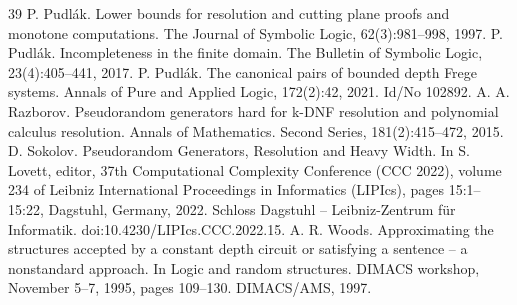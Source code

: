 \documentclass[10pt,a4paper]{article}
\begin{document}
\begin{thebibliography}{39}
 P. Pudlák. Lower bounds for resolution and cutting plane proofs and monotone computations. The Journal of Symbolic Logic, 62(3):981–998, 1997.
 P. Pudlák. Incompleteness in the finite domain. The Bulletin of Symbolic Logic, 23(4):405–441, 2017.
 P. Pudlák. The canonical pairs of bounded depth Frege systems. Annals of Pure and Applied Logic, 172(2):42, 2021. Id/No 102892.
 A. A. Razborov. Pseudorandom generators hard for k-DNF resolution and polynomial calculus resolution. Annals of Mathematics. Second Series, 181(2):415–472, 2015.
 D. Sokolov. Pseudorandom Generators, Resolution and Heavy Width. In S. Lovett, editor, 37th Computational Complexity Conference (CCC 2022), volume 234 of Leibniz International Proceedings in Informatics (LIPIcs), pages 15:1–15:22, Dagstuhl, Germany, 2022. Schloss Dagstuhl – Leibniz-Zentrum für Informatik. doi:10.4230/LIPIcs.CCC.2022.15.
 A. R. Woods. Approximating the structures accepted by a constant depth circuit or satisfying a sentence – a nonstandard approach. In Logic and random structures. DIMACS workshop, November 5–7, 1995, pages 109–130. DIMACS/AMS, 1997.
\end{thebibliography}
\end{document}

